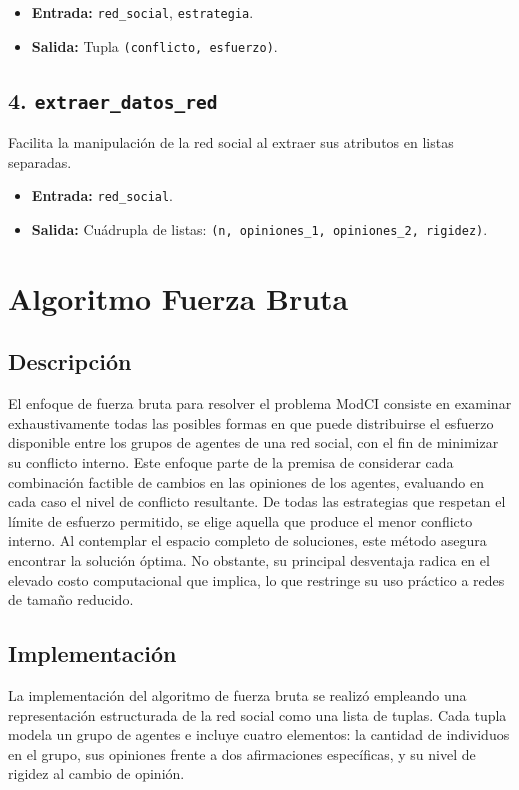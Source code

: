 \documentclass[11pt,letter]{article}
\begin{document}
        \begin{itemize}
          \item \textbf{Entrada:} \texttt{red\_social}, \texttt{estrategia}.
          \item \textbf{Salida:} Tupla \texttt{(conflicto, esfuerzo)}.
        \end{itemize}
    
    \subsection*{4. \texttt{extraer\_datos\_red}} 
        Facilita la manipulación de la red social al extraer sus atributos en listas separadas.
        
        \begin{itemize}
          \item \textbf{Entrada:} \texttt{red\_social}.
          \item \textbf{Salida:} Cuádrupla de listas: \texttt{(n, opiniones\_1, opiniones\_2, rigidez)}.
        \end{itemize}

\newpage
\section{Algoritmo Fuerza Bruta}
\subsection{Descripción}
El enfoque de fuerza bruta para resolver el problema ModCI consiste en examinar exhaustivamente todas las posibles formas en que puede distribuirse el esfuerzo disponible entre los grupos de agentes de una red social, con el fin de minimizar su conflicto interno. Este enfoque parte de la premisa de considerar cada combinación factible de cambios en las opiniones de los agentes, evaluando en cada caso el nivel de conflicto resultante. De todas las estrategias que respetan el límite de esfuerzo permitido, se elige aquella que produce el menor conflicto interno. Al contemplar el espacio completo de soluciones, este método asegura encontrar la solución óptima. No obstante, su principal desventaja radica en el elevado costo computacional que implica, lo que restringe su uso práctico a redes de tamaño reducido.

\subsection{Implementación}
La implementación del algoritmo de fuerza bruta se realizó empleando una representación estructurada de la red social como una lista de tuplas. Cada tupla modela un grupo de agentes e incluye cuatro elementos: la cantidad de individuos en el grupo, sus opiniones frente a dos afirmaciones específicas, y su nivel de rigidez al cambio de opinión.
\end{document}
